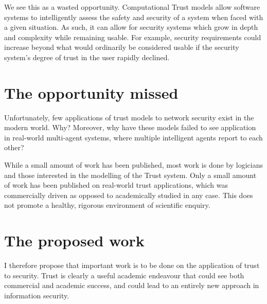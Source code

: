 \documentclass{tufte-handout}
\begin{document}
We see this as a wasted opportunity. Computational Trust models allow software systems to intelligently assess the safety and security of a system when faced with a given situation. As such, it can allow for security systems which grow in depth and complexity while remaining usable. For example, security requirements could increase beyond what would ordinarily be considered usable if the security system's degree of trust in the user rapidly declined. \par

\section{The opportunity missed}
Unfortunately, few applications of trust models to network security exist in the modern world. Why? Moreover, why have these models failed to see application in real-world multi-agent systems, where multiple intelligent agents report to each other?\par

While a small amount of work has been published, most work is done by logicians and those interested in the modelling of the Trust system. Only a small amount of work has been published on real-world trust applications, which was commercially driven as opposed to academically studied in any case\cite{Yan2003}. This does not promote a healthy, rigorous environment of scientific enquiry.\par

\section{The proposed work}
I therefore propose that important work is to be done on the application of trust to security. Trust is clearly a useful academic endeavour that could see both commercial and academic success, and could lead to an entirely new approach in information security.\par
\end{document}
